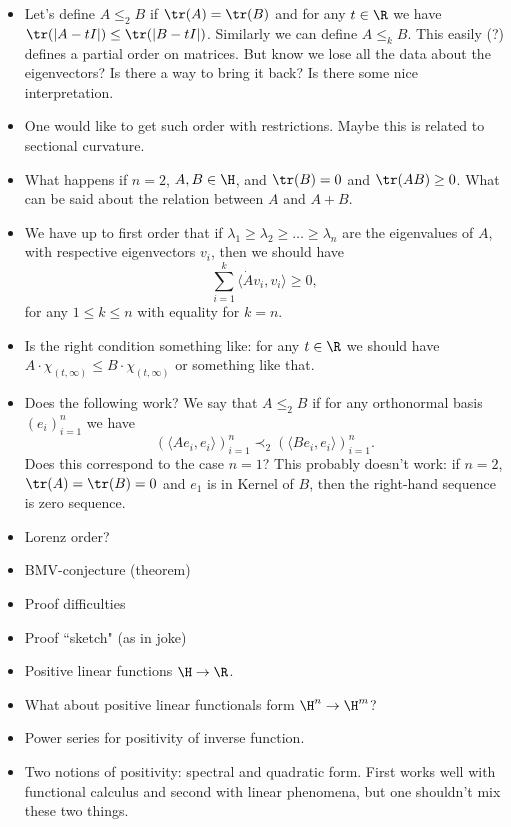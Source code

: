 \begin{itemize}
	\item Let's define $A \leq_{2} B$ if $\tr(A) = \tr(B)$ and for any $t \in \R$ we have $\tr(|A - t I|) \leq \tr(|B - t I|)$. Similarly we can define $A \leq_{k} B$. This easily (?) defines a partial order on matrices. But know we lose all the data about the eigenvectors? Is there a way to bring it back? Is there some nice interpretation.
	\item One would like to get such order with restrictions. Maybe this is related to sectional curvature.
	\item What happens if $n = 2$, $A, B \in \H$, and $\tr(B) = 0$ and $\tr(AB) \geq 0$. What can be said about the relation between $A$ and $A + B$.
	\item We have up to first order that if $\lambda_{1} \geq \lambda_{2} \geq \ldots \geq \lambda_{n}$ are the eigenvalues of $A$, with respective eigenvectors $v_{i}$, then we should have
	\[
		\sum_{i = 1}^{k} \langle \dot{A} v_{i}, v_{i}\rangle \geq 0,
	\]
	for any $1 \leq k \leq n$ with equality for $k = n$.
	\item Is the right condition something like: for any $t \in \R$ we should have $A \cdot \chi_{(t, \infty)} \leq B \cdot \chi_{(t, \infty)}$ or something like that.
	\item Does the following work? We say that $A \leq_{2} B$ if for any orthonormal basis $(e_{i})_{i = 1}^{n}$ we have
	\[
		(\langle A e_{i}, e_{i} \rangle)_{i = 1}^{n} \prec_{2} (\langle B e_{i}, e_{i} \rangle)_{i = 1}^{n}.
	\]
	Does this correspond to the case $n = 1$? This probably doesn't work: if $n = 2$, $\tr(A) = \tr(B) = 0$ and $e_{1}$ is in Kernel of $B$, then the right-hand sequence is zero sequence.
	\item Lorenz order?
	\item BMV-conjecture (theorem)
	\item Proof difficulties
	\item Proof ``sketch" (as in joke)
	\item Positive linear functions $\H \to \R$.
	\item What about positive linear functionals form $\H^{n} \to \H^{m}$?
	\item Power series for positivity of inverse function.
	\item Two notions of positivity: spectral and quadratic form. First works well with functional calculus and second with linear phenomena, but one shouldn't mix these two things.
\end{itemize}





